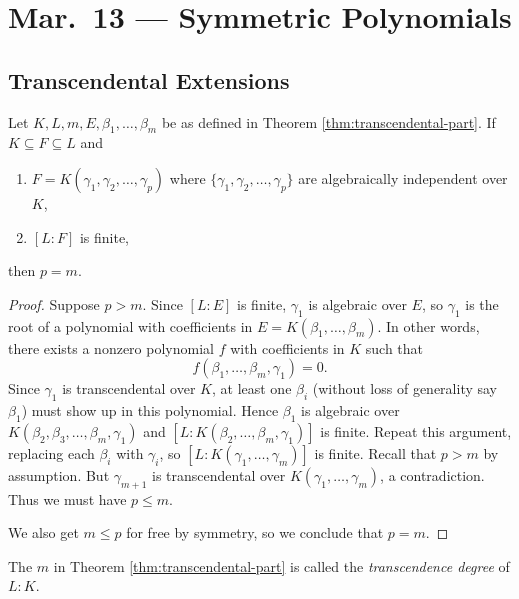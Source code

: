 \chapter{Mar.~13 --- Symmetric Polynomials}

\section{Transcendental Extensions}

\begin{theorem}
  Let $K, L, m, E, \beta_1, \dots, \beta_m$ be as
  defined in Theorem
  \ref{thm:transcendental-part}.
  If $K \subseteq F \subseteq L$ and
  \begin{enumerate}
    \item $F = K(\gamma_1, \gamma_2, \dots, \gamma_p)$
      where $\{\gamma_1, \gamma_2, \dots, \gamma_p\}$ are
      algebraically independent over $K$,
    \item $[L : F]$ is finite,
  \end{enumerate}
  then $p = m$.
\end{theorem}

\begin{proof}
  Suppose $p > m$. Since $[L : E]$ is finite,
  $\gamma_1$ is algebraic over $E$, so
  $\gamma_1$ is the root of a polynomial with coefficients
  in $E = K(\beta_1, \dots, \beta_m)$. In other words,
  there exists a nonzero polynomial $f$ with coefficients
  in $K$ such that
  \[
    f(\beta_1, \dots, \beta_m, \gamma_1) = 0.
  \]
  Since $\gamma_1$ is transcendental over $K$,
  at least one $\beta_i$ (without loss of generality
  say $\beta_1$) must show up in this polynomial. Hence
  $\beta_1$ is algebraic over
  $K(\beta_2, \beta_3, \dots, \beta_m, \gamma_1)$
  and $[L : K(\beta_2, \dots, \beta_m, \gamma_1)]$
  is finite. Repeat this argument, replacing
  each $\beta_i$ with $\gamma_i$, so
  $[L : K(\gamma_1, \dots, \gamma_m)]$ is finite.
  Recall that $p > m$ by assumption.
  But $\gamma_{m + 1}$ is transcendental over
  $K(\gamma_1, \dots, \gamma_m)$, a contradiction. Thus
  we must have $p \le m$.

  We also get $m \le p$ for free by symmetry, so we
  conclude that $p = m$.
\end{proof}

\begin{definition}
  The $m$ in Theorem \ref{thm:transcendental-part} is
  called the \emph{transcendence degree} of $L : K$.
\end{definition}

